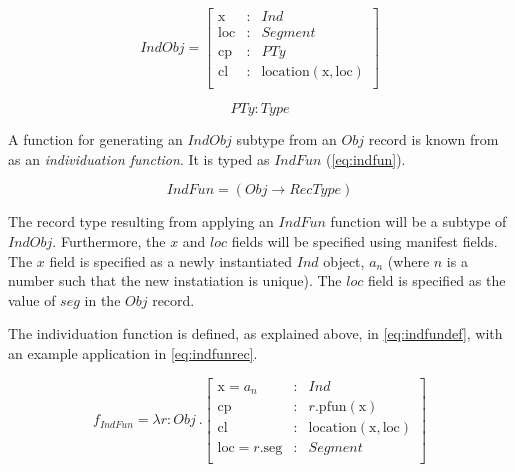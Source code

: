 \begin{equation}\label{eq:indobj}
IndObj = \left[\begin{array}{rcl}
\text{x} &:& Ind \\
\text{loc} &:& Segment \\
\text{cp} &:& PTy \\
\text{cl} &:& \text{location}(\text{x}, \text{loc}) \\
\end{array}\right]
\end{equation}

\begin{equation}\label{eq:pty}
PTy : Type
\end{equation}

A function for generating an $IndObj$ subtype from an $Obj$ record is known from \cite{lspc} as an \textit{individuation function}.
It is typed as $IndFun$ (\autoref{eq:indfun}).

\begin{equation}\label{eq:indfun}
IndFun = ( Obj \rightarrow RecType )
\end{equation}

The record type resulting from applying an $IndFun$ function will be a subtype of $IndObj$.
Furthermore, the $x$ and $loc$ fields will be specified using manifest fields.
The $x$ field is specified as a newly instantiated $Ind$ object, $a_n$ (where $n$ is a number such that the new instatiation is unique).
The $loc$ field is specified as the value of $seg$ in the $Obj$ record.


The individuation function is defined, as explained above, in \autoref{eq:indfundef}, with an example application in \autoref{eq:indfunrec}.

\begin{equation}\label{eq:indfundef}
f_{IndFun} = \lambda r : Obj\ . \left[\begin{array}{lcl}
    \text{x} = a_n &:& Ind \\
    \text{cp} &:& r.\text{pfun}(\text{x}) \\
    \text{cl} &:& \text{location}(\text{x}, \text{loc}) \\
    \text{loc} = r.\text{seg} &:& Segment\\
\end{array}\right]
\end{equation}

